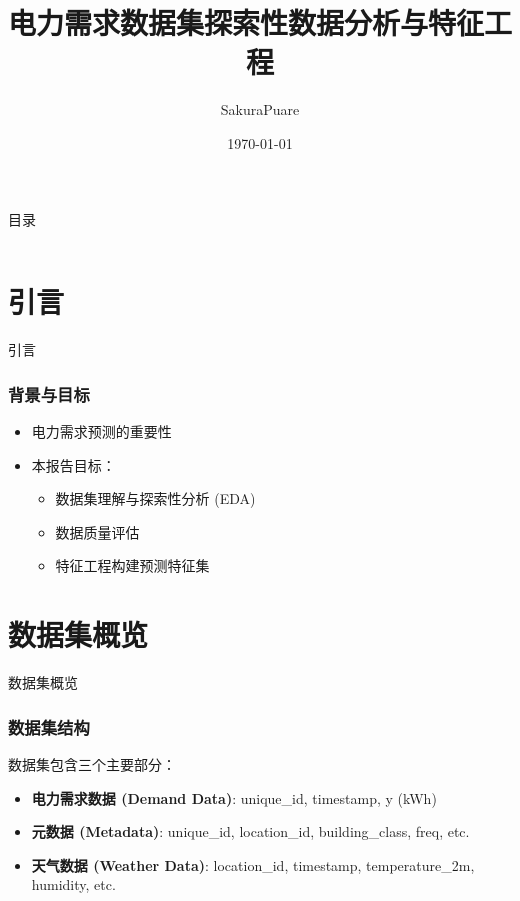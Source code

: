 \documentclass{beamer} %
\title{电力需求数据集探索性数据分析与特征工程} %
\author{SakuraPuare} %
\institute{\href{https://github.com/SakuraPuare/ElectricityDemand}{github.com/SakuraPuare/ElectricityDemand}}
\date{\today} %
\begin{document}
{
\frame{\titlepage}
}

\begin{frame}{目录}
    \begin{columns}[T,onlytextwidth]
        \begin{column}{0.5\textwidth}
            \tableofcontents[sections={1-4}]
        \end{column}
        \begin{column}{0.5\textwidth}
            \tableofcontents[sections={5-10}]
        \end{column}
    \end{columns}
\end{frame}


\section{引言}
\begin{frame}{引言}
    \frametitle{背景与目标}
    \begin{itemize}
        \item 电力需求预测的重要性
        \item 本报告目标：
        \begin{itemize}
            \item 数据集理解与探索性分析 (EDA)
            \item 数据质量评估
            \item 特征工程构建预测特征集
        \end{itemize}
    \end{itemize}
\end{frame}

\section{数据集概览}
\begin{frame}{数据集概览}
    \frametitle{数据集结构}
    数据集包含三个主要部分：
    \begin{itemize}
        \item \textbf{电力需求数据 (Demand Data)}: unique\_id, timestamp, y (kWh)
        \item \textbf{元数据 (Metadata)}: unique\_id, location\_id, building\_class, freq, etc.
        \item \textbf{天气数据 (Weather Data)}: location\_id, timestamp, temperature\_2m, humidity, etc.
    \end{itemize}
\end{frame}
\end{document}
